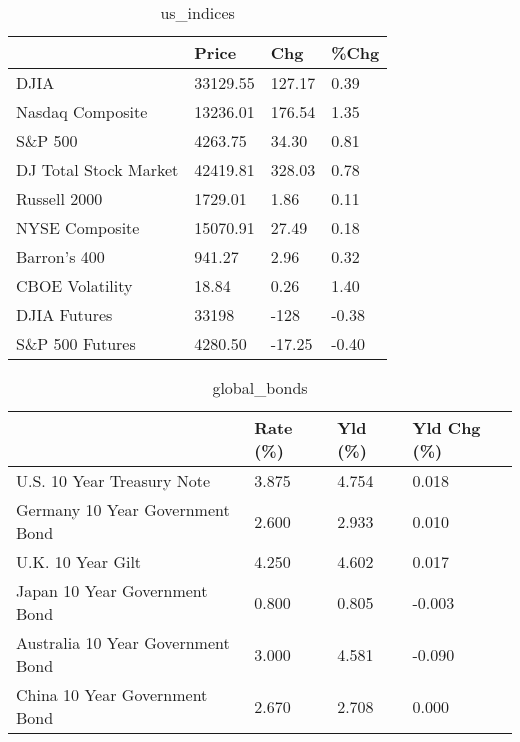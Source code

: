 \documentclass{article}%
\begin{document}
%


\begin{table}[htbp]%
\caption{us\_indices}%
\centering%
\begin{adjustbox}{width=1\textwidth}%
\begin{tabular}{llll}
\toprule
                      &    Price &    Chg &  \%Chg \\
\midrule
                 DJIA & 33129.55 & 127.17 &  0.39 \\
     Nasdaq Composite & 13236.01 & 176.54 &  1.35 \\
              S\&P 500 &  4263.75 &  34.30 &  0.81 \\
DJ Total Stock Market & 42419.81 & 328.03 &  0.78 \\
         Russell 2000 &  1729.01 &   1.86 &  0.11 \\
       NYSE Composite & 15070.91 &  27.49 &  0.18 \\
         Barron's 400 &   941.27 &   2.96 &  0.32 \\
      CBOE Volatility &    18.84 &   0.26 &  1.40 \\
         DJIA Futures &    33198 &   -128 & -0.38 \\
      S\&P 500 Futures &  4280.50 & -17.25 & -0.40 \\
\bottomrule
\end{tabular}
%
\end{adjustbox}%
\end{table}

%


\begin{table}[htbp]%
\caption{global\_bonds}%
\centering%
\begin{adjustbox}{width=1\textwidth}%
\begin{tabular}{llll}
\toprule
                                  & Rate (\%) & Yld (\%) & Yld Chg (\%) \\
\midrule
       U.S. 10 Year Treasury Note &    3.875 &   4.754 &       0.018 \\
  Germany 10 Year Government Bond &    2.600 &   2.933 &       0.010 \\
                U.K. 10 Year Gilt &    4.250 &   4.602 &       0.017 \\
    Japan 10 Year Government Bond &    0.800 &   0.805 &      -0.003 \\
Australia 10 Year Government Bond &    3.000 &   4.581 &      -0.090 \\
    China 10 Year Government Bond &    2.670 &   2.708 &       0.000 \\
\bottomrule
\end{tabular}
%
\end{adjustbox}%
\end{table}
\end{document}
